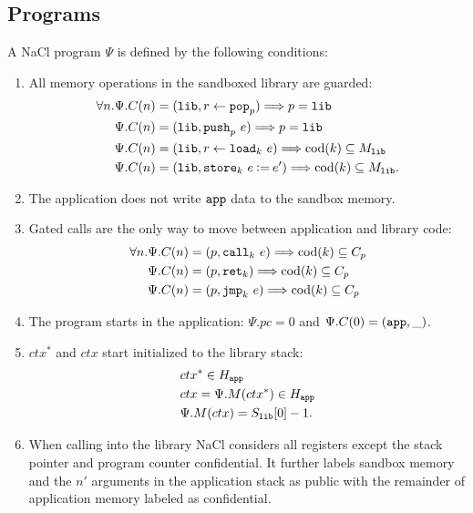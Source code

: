 \subsection{Programs}

A NaCl program $\Psi$ is defined by the following conditions:

\begin{enumerate}
\item
  All memory operations in the sandboxed library are guarded:
  \begin{align*}
    \forall n.
    & \Psi.C(n) = (\mathtt{lib}, {r} \leftarrow \mathtt{pop}_{p}) \Longrightarrow p = \mathtt{lib} \\
    & \Psi.C(n) = (\mathtt{lib}, \mathtt{push}_{p}\ {e}) \Longrightarrow p = \mathtt{lib} \\
    & \Psi.C(n) = (\mathtt{lib}, {r} \leftarrow \mathtt{load}_{k}\ {e}) \Longrightarrow \operatorname{cod}({k}) \subseteq M_{\mathtt{lib}} \\
    & \Psi.C(n) = (\mathtt{lib}, \mathtt{store}_{k}\ {e} \mathbin{\vcentcolon=} {e'}) \Longrightarrow \operatorname{cod}({k}) \subseteq M_{\mathtt{lib}}.
  \end{align*}

\item
  The application does not write $\mathtt{app}$ data to the sandbox memory.

\item
  Gated calls are the only way to move between application and library code:
  \begin{align*}
    \forall n.
    & \Psi.C(n) = (p, \mathtt{call}_{{k}}\ {e}) \Longrightarrow \operatorname{cod}({k}) \subseteq C_{p} \\
    & \Psi.C(n) = (p, \mathtt{ret}_{{k}}) \Longrightarrow \operatorname{cod}({k}) \subseteq C_{p} \\
    & \Psi.C(n) = (p, \mathtt{jmp}_{{k}}\ {e}) \Longrightarrow \operatorname{cod}({k}) \subseteq C_{p} \\
  \end{align*}

\item
  The program starts in the application: $\Psi.pc = 0$ and $\Psi.C(0) = (\mathtt{app}, \_)$.

\item
  $ctx^{\ast}$ and $ctx$ start initialized to the library stack:
  \begin{align*}
    & ctx^{\ast} \in H_{\mathtt{app}} \\
    & ctx = \Psi.M(ctx^{\ast}) \in H_{\mathtt{app}} \\
    & \Psi.M(ctx) = S_{\mathtt{lib}}[0] - 1.
  \end{align*}

\item
  When calling into the library NaCl considers all registers except the stack
  pointer and program counter confidential.
  It further labels sandbox memory and the $n'$ arguments in the application
  stack as public with the remainder of application memory labeled as
  confidential.


\end{enumerate}
